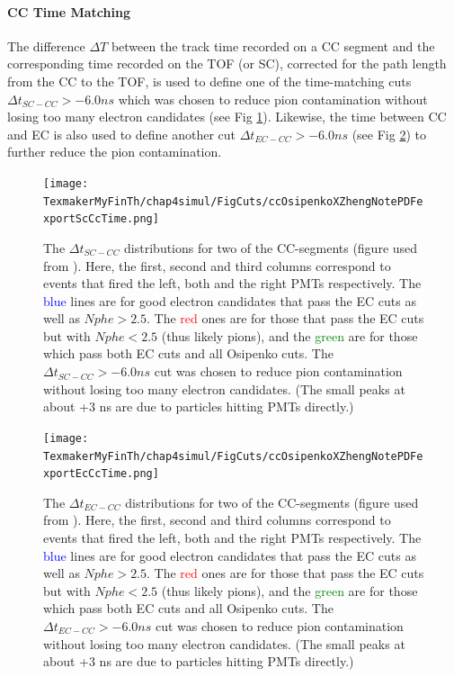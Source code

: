 \paragraph{CC Time Matching}
The difference $\Delta T$ between the track time recorded on a CC segment and the corresponding time recorded on the TOF (or SC), corrected for the path length from the CC to the TOF, is used to define one of the time-matching cuts $\Delta t_{SC - CC} > - 6.0 ns$ which was chosen to reduce pion contamination without losing too many electron candidates (see Fig \ref{scCcTime}). Likewise, the time between CC and EC is also used to define another cut $\Delta t_{EC - CC} > - 6.0 ns$ (see Fig \ref{ecCcTime}) to further reduce the pion contamination.

\begin{figure}[H] %
\centering
\leavevmode \texttt{[image: TexmakerMyFinTh/chap4simul/FigCuts/ccOsipenkoXZhengNotePDFexportScCcTime.png]}  
\caption[SC - CC Time]{The $\Delta t_{SC - CC}$ distributions for two of the CC-segments (figure used from \cite{anaNoteXZheng}). Here, the first, second and third columns correspond to events that fired the left, both and the right PMTs respectively. The \textcolor{blue}{blue} lines are for good electron candidates that pass the EC cuts as well as $Nphe > 2.5$. The \textcolor{red}{red} ones are for those that pass the EC cuts but with $Nphe < 2.5$ (thus likely pions), and the \textcolor{green}{green} are for those which pass both EC cuts and all Osipenko cuts. The $\Delta t_{SC - CC} > - 6.0 ns$ cut was chosen to reduce pion contamination without losing too many electron candidates. (The small peaks at about +3 ns are due to particles hitting PMTs directly.)}
\label{scCcTime}
\end{figure}

\begin{figure}[H] %
\centering
\leavevmode \texttt{[image: TexmakerMyFinTh/chap4simul/FigCuts/ccOsipenkoXZhengNotePDFexportEcCcTime.png]}  
\caption[EC - CC Time]{The $\Delta t_{EC - CC}$ distributions for two of the CC-segments (figure used from \cite{anaNoteXZheng}). Here, the first, second and third columns correspond to events that fired the left, both and the right PMTs respectively. The \textcolor{blue}{blue} lines are for good electron candidates that pass the EC cuts as well as $Nphe > 2.5$. The \textcolor{red}{red} ones are for those that pass the EC cuts but with $Nphe < 2.5$ (thus likely pions), and the \textcolor{green}{green} are for those which pass both EC cuts and all Osipenko cuts. The $\Delta t_{EC - CC} > - 6.0 ns$ cut was chosen to reduce pion contamination without losing too many electron candidates. (The small peaks at about +3 ns are due to particles hitting PMTs directly.)}
\label{ecCcTime}
\end{figure}




